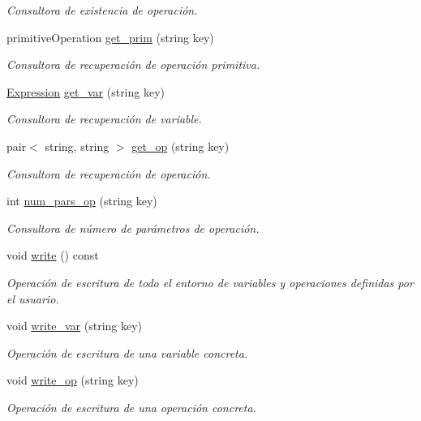 \begin{DoxyCompactItemize}
\begin{DoxyCompactList}\small\item\em Consultora de existencia de operación. \end{DoxyCompactList}\item 
primitive\+Operation \hyperlink{class_environment_a15eff205405da84c7466ac8f1ea6a54c}{get\+\_\+prim} (string key)
\begin{DoxyCompactList}\small\item\em Consultora de recuperación de operación primitiva. \end{DoxyCompactList}\item 
\hyperlink{class_expression}{Expression} \hyperlink{class_environment_aa85854b19601fee7ef557afbe8029a57}{get\+\_\+var} (string key)
\begin{DoxyCompactList}\small\item\em Consultora de recuperación de variable. \end{DoxyCompactList}\item 
pair$<$ string, string $>$ \hyperlink{class_environment_a4d1630588a2868e2a3ae3868087dedf2}{get\+\_\+op} (string key)
\begin{DoxyCompactList}\small\item\em Consultora de recuperación de operación. \end{DoxyCompactList}\item 
int \hyperlink{class_environment_a22ef2de52498e9f0a7491c85e2148f83}{num\+\_\+pars\+\_\+op} (string key)
\begin{DoxyCompactList}\small\item\em Consultora de número de parámetros de operación. \end{DoxyCompactList}\item 
void \hyperlink{class_environment_ae219751d8017a3ca66b11b74fd45cf9c}{write} () const 
\begin{DoxyCompactList}\small\item\em Operación de escritura de todo el entorno de variables y operaciones definidas por el usuario. \end{DoxyCompactList}\item 
void \hyperlink{class_environment_a2fda411113f72e6e86176b8f00fcc9d7}{write\+\_\+var} (string key)
\begin{DoxyCompactList}\small\item\em Operación de escritura de una variable concreta. \end{DoxyCompactList}\item 
void \hyperlink{class_environment_a6f449052df64c7f8bf44428835dc3d7b}{write\+\_\+op} (string key)
\begin{DoxyCompactList}\small\item\em Operación de escritura de una operación concreta. \end{DoxyCompactList}\end{DoxyCompactItemize}


